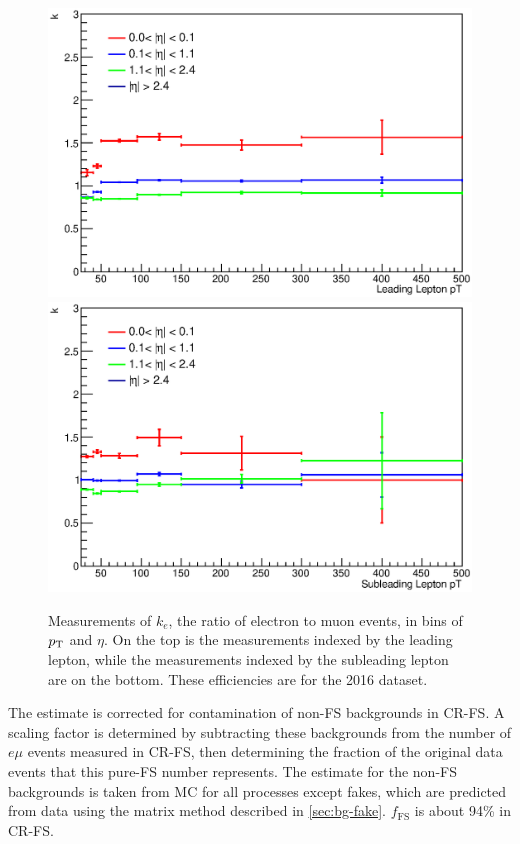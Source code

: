 \begin{centering}
\begin{figure}[!hbt]
\myfloatalign
\includegraphics[width=.85\linewidth]{figures/fs/data_efficiencies_2j_Z_lep0.eps}
\includegraphics[width=.85\linewidth]{figures/fs/data_efficiencies_2j_Z_lep1.eps}
\caption{Measurements of $k_e$, the ratio of electron to muon events, in bins of $p_{\text{T}}$ and $\eta$. On the top is the measurements indexed by the leading lepton, while the measurements indexed by the subleading lepton are on the bottom. These efficiencies are for the 2016 dataset.}
\label{fig:fs_k}
\end{figure}
\end{centering}

The estimate is corrected for contamination of non-\ac{FS} backgrounds in CR-FS. A scaling factor is determined by subtracting these backgrounds from the number of $e\mu$ events measured in CR-FS, then determining the fraction of the original data events that this pure-\ac{FS} number represents. The estimate for the non-\ac{FS} backgrounds is taken from \ac{MC} for all processes except fakes, which are predicted from data using the matrix method described in \autoref{sec:bg-fake}. $f_{\mathrm{FS}}$ is about 94\% in CR-FS.

